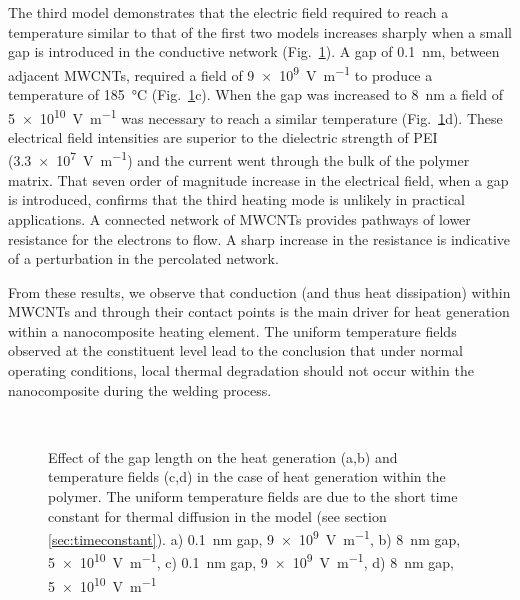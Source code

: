 The third model demonstrates that the electric field required to reach a temperature similar to that of the first two models increases sharply when a small gap is introduced in the conductive network (Fig.~\ref{fig:result_gap}). 
A gap of \SI{0.1}{\nano\metre}, between adjacent MWCNTs, required a field of \SI{9e9}{\volt\per\metre} to produce a temperature of \SI{185}{\celsius} (Fig.~\ref{fig:result_gap}c). 
When the gap was increased to \SI{8}{\nano\metre} a field of \SI{5e10}{\volt\per\metre} was necessary to reach a similar temperature (Fig.~\ref{fig:result_gap}d). 
These electrical field intensities are superior to the dielectric strength of PEI (\SI{3.3e7}{\volt\per\metre}) and the current went through the bulk of the polymer matrix. 
That seven order of magnitude increase in the electrical field, when a gap is introduced, confirms that the third heating mode is unlikely in practical applications. 
A connected network of MWCNTs provides pathways of lower resistance for the electrons to flow. 
A sharp increase in the resistance is indicative of a perturbation in the percolated network. 

From these results, we observe that conduction (and thus heat dissipation) within MWCNTs and through their contact points is the main driver for heat generation within a nanocomposite heating element. 
The uniform temperature fields observed at the constituent level lead to the conclusion that under normal operating conditions, local thermal degradation should not occur within the nanocomposite during the welding process. 

\begin{figure}[h!]
	\centering
	 \\
	\caption{Effect of the gap length on the heat generation (a,b) and temperature fields (c,d) in the case of heat generation within the polymer. The uniform temperature fields are due to the short time constant for thermal diffusion in the model (see section \ref{sec:timeconstant}).  a) \SI{0.1}{\nano\metre} gap, \SI{9e9}{\volt\per\metre}, b) \SI{8}{\nano\metre} gap, \SI{5e10}{\volt\per\metre}, c) \SI{0.1}{\nano\metre} gap, \SI{9e9}{\volt\per\metre}, d) \SI{8}{\nano\metre} gap, \SI{5e10}{\volt\per\metre} \cite{Brassard2018_figshare_article1}}
	\label{fig:result_gap}
\end{figure}


